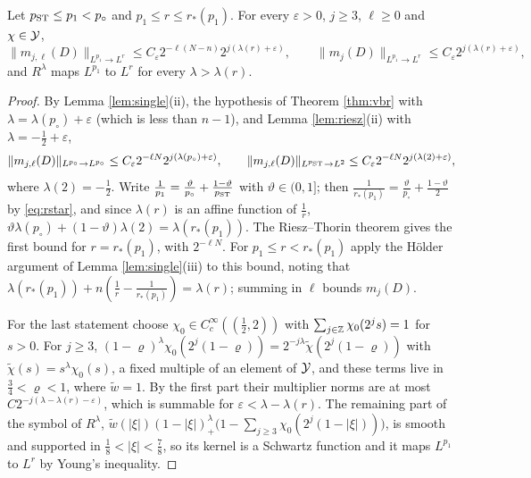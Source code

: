 \begin{corollary}\label{cor:single}
Let $p_{\rm ST}\le p_1<p_\circ$ and $p_1\le r\le r_*(p_1)$. For every $\varepsilon>0$, $j\ge3$, $\ell\ge0$ and
$\chi\in\mathcal Y$,
\[
\|m_{j,\ell}(D)\|_{L^{p_1}\to L^r}\le C_\varepsilon2^{-\ell(N-n)}2^{j(\lambda(r)+\varepsilon)},\qquad
\|m_j(D)\|_{L^{p_1}\to L^r}\le C_\varepsilon2^{j(\lambda(r)+\varepsilon)} ,
\]
and $R^\lambda$ maps $L^{p_1}$ to $L^r$ for every $\lambda>\lambda(r)$.
\end{corollary}

\begin{proof}
By Lemma \ref{lem:single}(ii), the hypothesis of Theorem \ref{thm:vbr} with $\lambda=\lambda(p_\circ)+\varepsilon$
(which is less than $n-1$), and Lemma \ref{lem:riesz}(ii) with $\lambda=-\frac12+\varepsilon$,
\[
\|m_{j,\ell}(D)\|_{L^{p_\circ}\to L^{p_\circ}}\le C_\varepsilon2^{-\ell N}2^{j(\lambda(p_\circ)+\varepsilon)},\qquad
\|m_{j,\ell}(D)\|_{L^{p_{\rm ST}}\to L^2}\le C_\varepsilon2^{-\ell N}2^{j(\lambda(2)+\varepsilon)},
\]
where $\lambda(2)=-\frac12$. Write $\frac1{p_1}=\frac\vartheta{p_\circ}+\frac{1-\vartheta}{p_{\rm ST}}$ with
$\vartheta\in(0,1]$; then $\frac1{r_*(p_1)}=\frac\vartheta{p_\circ}+\frac{1-\vartheta}2$ by \eqref{eq:rstar}, and since
$\lambda(r)$ is an affine function of $\frac1r$, $\vartheta\lambda(p_\circ)+(1-\vartheta)\lambda(2)=\lambda(r_*(p_1))$. The
Riesz--Thorin theorem gives the first bound for $r=r_*(p_1)$, with $2^{-\ell N}$. For
$p_1\le r<r_*(p_1)$ apply the H\"older argument of Lemma \ref{lem:single}(iii) to this bound, noting that
$\lambda(r_*(p_1))+n(\frac1r-\frac1{r_*(p_1)})=\lambda(r)$; summing in $\ell$ bounds $m_j(D)$.

For the last statement choose $\chi_0\in C^\infty_c((\frac12,2))$ with $\sum_{j\in\mathbb{Z}}\chi_0(2^js)=1$ for $s>0$.
For $j\ge3$, $(1-\varrho)^\lambda\chi_0(2^j(1-\varrho))=2^{-j\lambda}\tilde\chi(2^j(1-\varrho))$ with
$\tilde\chi(s)=s^\lambda\chi_0(s)$, a fixed multiple of an element of $\mathcal Y$, and these terms live in
$\frac34<\varrho<1$, where $\tilde w=1$. By the first part their multiplier norms are at most
$C2^{-j(\lambda-\lambda(r)-\varepsilon)}$, which is summable for $\varepsilon<\lambda-\lambda(r)$. The remaining part of the
symbol of $R^\lambda$, $\tilde w(|\xi|)(1-|\xi|)^\lambda_+\bigl(1-\sum_{j\ge3}\chi_0(2^j(1-|\xi|))\bigr)$, is smooth
and supported in $\frac18<|\xi|<\frac78$, so its kernel is a Schwartz function and it maps $L^{p_1}$ to
$L^r$ by Young's inequality.
\end{proof}

